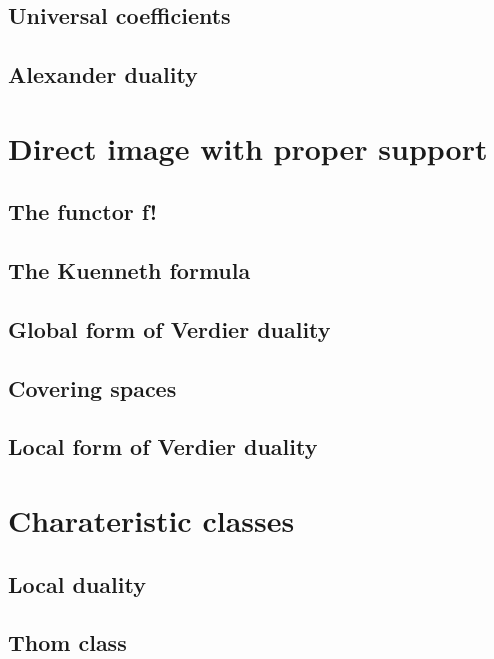 \documentclass[5pt]{article}
\theoremstyle{definition}
\theoremstyle{remark}
\begin{document}
	\subsection{Universal coefficients}
	
	\subsection{Alexander duality}
	
	\newpage
	
	\section{Direct image with proper support}
	
	\subsection{The functor f!}
	
	\subsection{The Kuenneth formula}
	
	\subsection{Global form of Verdier duality}
	
	\subsection{Covering spaces}
	
	\subsection{Local form of Verdier duality}
	
	\newpage
	
	\section{Charateristic classes}
	
	\subsection{Local duality}
	
	\subsection{Thom class}
	
\end{document}
